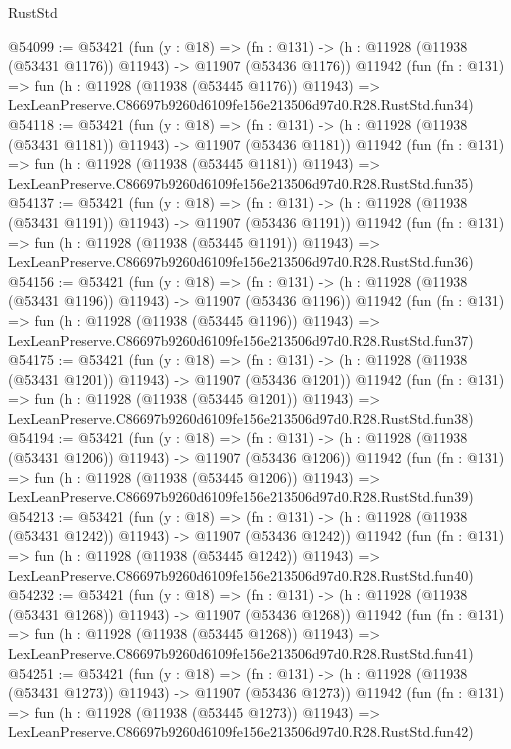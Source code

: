 \begin{lexlean}{RustStd}
\begin{coremodule}
@54099 := @53421
    (fun (y : @18) =>
    (fn : @131) -> (h : @11928 (@11938 (@53431 @1176)) @11943) -> @11907 (@53436 @1176))
    @11942
    (fun (fn : @131) =>
    fun (h : @11928 (@11938 (@53445 @1176)) @11943) =>
    LexLeanPreserve.C86697b9260d6109fe156e213506d97d0.R28.RustStd.fun34)
@54118 := @53421
    (fun (y : @18) =>
    (fn : @131) -> (h : @11928 (@11938 (@53431 @1181)) @11943) -> @11907 (@53436 @1181))
    @11942
    (fun (fn : @131) =>
    fun (h : @11928 (@11938 (@53445 @1181)) @11943) =>
    LexLeanPreserve.C86697b9260d6109fe156e213506d97d0.R28.RustStd.fun35)
@54137 := @53421
    (fun (y : @18) =>
    (fn : @131) -> (h : @11928 (@11938 (@53431 @1191)) @11943) -> @11907 (@53436 @1191))
    @11942
    (fun (fn : @131) =>
    fun (h : @11928 (@11938 (@53445 @1191)) @11943) =>
    LexLeanPreserve.C86697b9260d6109fe156e213506d97d0.R28.RustStd.fun36)
@54156 := @53421
    (fun (y : @18) =>
    (fn : @131) -> (h : @11928 (@11938 (@53431 @1196)) @11943) -> @11907 (@53436 @1196))
    @11942
    (fun (fn : @131) =>
    fun (h : @11928 (@11938 (@53445 @1196)) @11943) =>
    LexLeanPreserve.C86697b9260d6109fe156e213506d97d0.R28.RustStd.fun37)
@54175 := @53421
    (fun (y : @18) =>
    (fn : @131) -> (h : @11928 (@11938 (@53431 @1201)) @11943) -> @11907 (@53436 @1201))
    @11942
    (fun (fn : @131) =>
    fun (h : @11928 (@11938 (@53445 @1201)) @11943) =>
    LexLeanPreserve.C86697b9260d6109fe156e213506d97d0.R28.RustStd.fun38)
@54194 := @53421
    (fun (y : @18) =>
    (fn : @131) -> (h : @11928 (@11938 (@53431 @1206)) @11943) -> @11907 (@53436 @1206))
    @11942
    (fun (fn : @131) =>
    fun (h : @11928 (@11938 (@53445 @1206)) @11943) =>
    LexLeanPreserve.C86697b9260d6109fe156e213506d97d0.R28.RustStd.fun39)
@54213 := @53421
    (fun (y : @18) =>
    (fn : @131) -> (h : @11928 (@11938 (@53431 @1242)) @11943) -> @11907 (@53436 @1242))
    @11942
    (fun (fn : @131) =>
    fun (h : @11928 (@11938 (@53445 @1242)) @11943) =>
    LexLeanPreserve.C86697b9260d6109fe156e213506d97d0.R28.RustStd.fun40)
@54232 := @53421
    (fun (y : @18) =>
    (fn : @131) -> (h : @11928 (@11938 (@53431 @1268)) @11943) -> @11907 (@53436 @1268))
    @11942
    (fun (fn : @131) =>
    fun (h : @11928 (@11938 (@53445 @1268)) @11943) =>
    LexLeanPreserve.C86697b9260d6109fe156e213506d97d0.R28.RustStd.fun41)
@54251 := @53421
    (fun (y : @18) =>
    (fn : @131) -> (h : @11928 (@11938 (@53431 @1273)) @11943) -> @11907 (@53436 @1273))
    @11942
    (fun (fn : @131) =>
    fun (h : @11928 (@11938 (@53445 @1273)) @11943) =>
    LexLeanPreserve.C86697b9260d6109fe156e213506d97d0.R28.RustStd.fun42)

\end{coremodule}
\end{lexlean}

